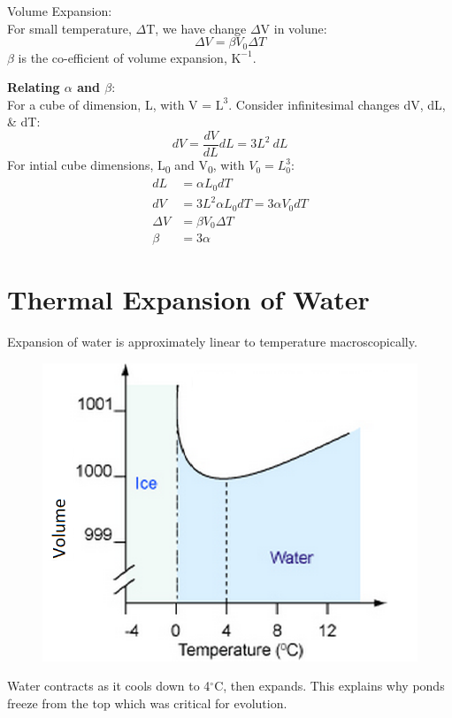 \documentclass[a4paper, 11pt, normalem]{report}
\begin{document}
Volume Expansion:\\
For small temperature, $\Delta$T, we have change $\Delta$V in volune:
\begin{equation}
    {\Delta}V = {\beta}V_{0}{\Delta}T
\end{equation}
$\beta$ is the co-efficient of volume expansion, $\text{K}^{-1}$.

\textbf{Relating ${\alpha}$ and ${\beta}$}:\\
For a cube of dimension, L, with V = $\text{L}^{3}$.
Consider infinitesimal changes dV, dL, \& dT:
\begin{equation}
	dV = \dfrac{dV}{dL}dL = 3L^{2}~dL
\end{equation}
For intial cube dimensions, L\textsubscript{0} and V\textsubscript{0}, with $V_{0} = L_{0}^{3}$:
\begin{align}
    dL &= {\alpha}L_{0}dT \\
    dV &= 3L^{2}{\alpha}L_{0}dT = 3{\alpha}V_{0}dT \\
    {\Delta}V &= {\beta}V_{0}{\Delta}T \\
    \beta &= 3\alpha
\end{align}

\section{Thermal Expansion of Water}
Expansion of water is approximately linear to temperature macroscopically.
\begin{figure}[H]
    \centering
    \includegraphics[scale=0.4]{water.png}
\end{figure}
Water contracts as it cools down to 4{$^\circ$}C, then expands.
This explains why ponds freeze from the top which was critical for evolution.
\end{document}
